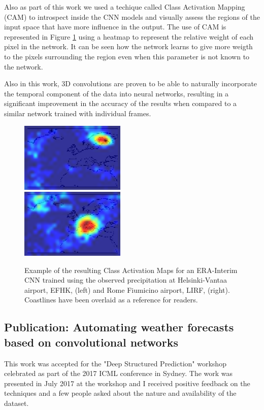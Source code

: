 Also as part of this work we used a techique called Class Activation Mapping (CAM) \citep{zhou2016learning} to introspect inside the CNN models and visually assess the regions of the input space that have more influence in the output. The use of CAM is represented in Figure \ref{paper3} using a heatmap to represent the relative weight of each pixel in the network. It can be seen how the network learns to give more weigth to the pixels surrounding the region even when this parameter is not known to the network.

Also in this work, 3D convolutions are proven to be able to naturally incorporate the temporal component of the data into neural networks, resulting in a significant improvement in the accuracy of the results when compared to a similar network trained with individual frames.

\begin{figure}[h]
 \centerline{\includegraphics[width=5cm]{paper3_2.png}\\\includegraphics[width=5cm]{paper3_1.png}}\caption{Example of the resulting Class Activation Maps for an ERA-Interim CNN trained using the observed precipitation at Helsinki-Vantaa airport, EFHK, (left) and Rome Fiumicino airport, LIRF, (right). Coastlines have been overlaid as a reference for readers.}\label{paper3}
\end{figure}


\subsection{Publication: Automating weather forecasts based on convolutional networks}

This work was accepted for the "Deep Structured Prediction" workshop celebrated as part of the 2017 ICML conference in Sydney. The work was presented in July 2017 at the workshop and I received positive feedback on the techniques and a few people asked about the nature and availability of the dataset.

